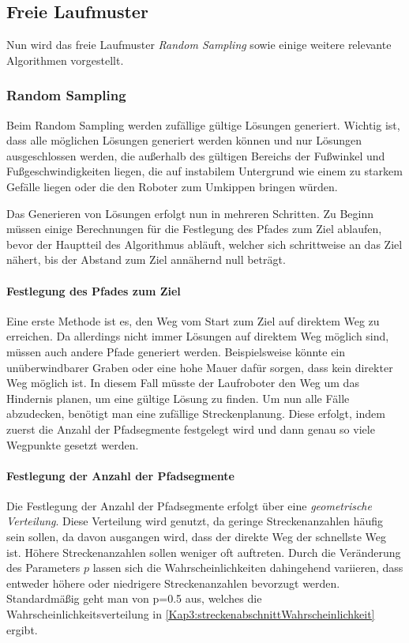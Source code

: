 \subsection{Freie Laufmuster}

Nun wird das freie Laufmuster \emph{Random Sampling} sowie einige weitere relevante Algorithmen vorgestellt. \autocite{herms2004}


\subsubsection{Random Sampling}

Beim Random Sampling werden zufällige gültige Lösungen generiert.  Wichtig ist, dass alle möglichen Lösungen generiert werden können und nur Lösungen ausgeschlossen werden, die außerhalb des gültigen Bereichs der Fußwinkel und Fußgeschwindigkeiten liegen, die auf instabilem Untergrund wie einem zu starkem Gefälle liegen oder die den Roboter zum Umkippen bringen würden.

Das Generieren von Lösungen erfolgt nun in mehreren Schritten. Zu Beginn müssen einige Berechnungen für die Festlegung des Pfades zum Ziel ablaufen, bevor der Hauptteil des Algorithmus abläuft, welcher sich schrittweise an das Ziel nähert, bis der Abstand zum Ziel annähernd null beträgt.

\paragraph{Festlegung des Pfades zum Ziel}

Eine erste Methode ist es, den Weg vom Start zum Ziel auf direktem Weg zu erreichen. Da allerdings nicht immer Lösungen auf direktem Weg möglich sind, müssen auch andere Pfade generiert werden. Beispielsweise könnte ein unüberwindbarer Graben oder eine hohe Mauer dafür sorgen, dass kein direkter Weg möglich ist. In diesem Fall müsste der Laufroboter den Weg um das Hindernis planen, um eine gültige Lösung zu finden. Um nun alle Fälle abzudecken, benötigt man eine zufällige Streckenplanung. Diese erfolgt, indem zuerst die Anzahl der Pfadsegmente festgelegt wird und dann genau so viele Wegpunkte gesetzt werden.

\paragraph{Festlegung der Anzahl der Pfadsegmente}

Die Festlegung der Anzahl der Pfadsegmente erfolgt über eine \emph{geometrische Verteilung}. Diese Verteilung wird genutzt, da geringe Streckenanzahlen häufig sein sollen, da davon ausgangen wird, dass der direkte Weg der schnellste Weg ist. Höhere Streckenanzahlen sollen weniger oft auftreten. Durch die Veränderung des Parameters $p$ lassen sich die Wahrscheinlichkeiten dahingehend variieren, dass entweder höhere oder niedrigere Streckenanzahlen bevorzugt werden. Standardmäßig geht man von p=\SI{0.5}{} aus, welches die Wahrscheinlichkeitsverteilung in \autoref{Kap3:streckenabschnittWahrscheinlichkeit} ergibt.

